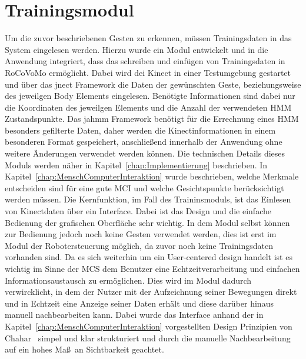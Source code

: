 \section{Trainingsmodul}
Um die zuvor beschriebenen Gesten zu erkennen, m\"ussen Trainingsdaten in das System eingelesen werden. Hierzu wurde ein Modul entwickelt und in die Anwendung integriert, dass das schreiben und einf\"ugen von Trainingsdaten in RoCoVoMo erm\"oglicht. Dabei wird dei Kinect in einer Testumgebung gestartet und \"uber das jnect Framework die Daten der gew\"unschten Geste, beziehungsweise des jeweilgen Body Elements eingelesen. Ben\"otigte Informationen sind dabei nur die Koordinaten des jeweilgen Elements und die Anzahl der verwendeten HMM Zustandspunkte. Das jahmm Framework ben\"otigt f\"ur die Errechnung eines \gls{HMM} besonders gefilterte Daten, daher werden die Kinectinformationen in einem besonderen Format gespeichert, anschlie\ss end innerhalb der Anwendung ohne weitere \"Anderungen verwendet werden k\"onnen. Die technischen Details dieses Moduls werden n\"aher in Kapitel~\ref{chap:Implementierung} beschrieben.
\newline
In Kapitel~\ref{chap:MenschComputerInteraktion} wurde beschrieben, welche Merkmale entscheiden sind f\"ur eine gute \gls{MCI} und welche Gesichtspunkte ber\"ucksichtigt werden m\"ussen. Die Kernfunktion, im Fall des Traininsmoduls, ist das Einlesen von Kinectdaten \"uber ein Interface. Dabei ist das Design und die einfache Bedienung der grafischen Oberfl\"ache sehr wichtig. In dem Modul selbst k\"onnen zur Bedienung jedoch noch keine Gesten verwendet werden, dies ist erst im Modul der Robotersteuerung m\"oglich, da zuvor noch keine Trainingsdaten vorhanden sind. Da es sich weiterhin um ein User-centered design handelt ist es wichtig im Sinne der \gls{MCS} dem Benutzer eine Echtzeitverarbeitung und einfachen Informationsaustausch zu erm\"oglichen. Dies wird im Modul dadurch verwircklicht, in dem der Nutzer mit der Aufzeichnung seiner Bewegungen direkt und in Echtzeit eine Anzeige seiner Daten erh\"alt und diese dar\"uber hinaus manuell nachbearbeiten kann. Dabei wurde das Interface anhand der in Kapitel~\ref{chap:MenschComputerInteraktion} vorgestellten Design Prinzipien von Chahar~\cite{bib:Chahar} simpel und klar strukturiert und durch die manuelle Nachbearbeitung auf ein hohes Ma\ss~an Sichtbarkeit geachtet.

